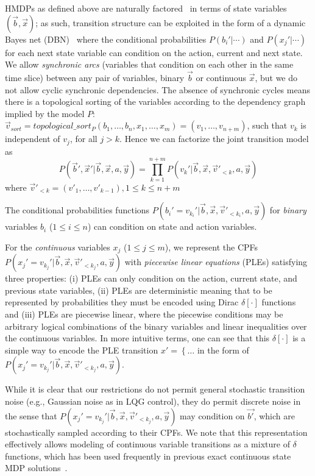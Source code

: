 HMDPs as defined above are naturally factored~\cite{boutilier99dt}
in terms of state variables $(\vec{b},\vec{x})$; as such,
transition structure can be exploited in the form of a dynamic Bayes
net (DBN)~\cite{dbn} where the conditional probabilities
$P(b_i'|\cdots)$ and $P(x_j'|\cdots)$ for each next state variable can
condition on the action, current and next state.  We allow  
\emph{synchronic arcs} (variables that condition on each
other in the same time slice) between any pair of variables, binary $\vec{b}$ or
continuous $\vec{x}$, but we do not allow cyclic synchronic dependencies. 
The absence of synchronic cycles means there is a topological sorting of the variables according to the dependency graph implied by the model $P$: $\vec{v}_{sort}=topological\_sort_{P}( b_1,\ldots,b_n,x_{1},\ldots,x_m ) =  ( v_1,\ldots, v_{n+m})$, such that $v_k$ is independent of $v_j$, for all $j >k$. Hence we can factorize the joint transition model as
{\footnotesize
\begin{equation}
P(\vec{b}',\vec{x}'|\vec{b},\vec{x},a,\vec{y}) = 
\prod_{k=1}^{n+m} P(v_k'| \vec{b},\vec{x}, \vec{v}'_{<k}, a,\vec{y}) \nonumber %
\end{equation}}
where $\vec{v}'_{<k} = ( v'_1,\ldots, v'_{k-1}), 1\leq k \leq n+m$

The conditional probabilities functions $P(b_i'=v_{k_i}'|\vec{b},\vec{x},\vec{v}'_{<{k_i}},a,\vec{y})$ for \emph{binary} variables $b_i$ ($1 \leq i \leq n$) can condition on state and action variables.  

For the \emph{continuous} variables $x_j$ ($1 \leq j \leq m$), we represent the CPFs $P(x_j'=v_{k_j}'|\vec{b},\vec{x},\vec{v}'_{<{k_j}},a,\vec{y})$ with \emph{piecewise
linear equations} (PLEs) satisfying three properties: (i) PLEs 
can only condition on the action, current state, and previous state variables, (ii) PLEs are
deterministic meaning that to be represented by probabilities they
must be encoded using Dirac $\delta[\cdot]$ functions and (iii) PLEs are piecewise linear, where the piecewise conditions may be arbitrary logical combinations of the binary variables
and linear inequalities over the continuous variables. In more intuitive
terms, one can see that this $\delta[\cdot]$ is a simple way to encode
the PLE transition $x' = \left\{ \ldots \right.$ in the form of 
$P(x_j'=v_{k_j}'|\vec{b},\vec{x},\vec{v}'_{<{k_j}},a,\vec{y})$.

While it is clear that our restrictions do not permit general stochastic transition
noise (e.g., Gaussian noise as in LQG control), they do permit
discrete noise in the sense that $P(x_j'=v_{k_j}'|\vec{b},\vec{x},\vec{v}'_{<{k_j}},a,\vec{y})$ may condition on $\vec{b'}$, which are stochastically sampled according to their CPFs.
We note that this representation effectively allows modeling of
continuous variable transitions as a mixture of $\delta$ functions,
which has been used frequently in previous exact continuous state MDP
solutions~\cite{feng04,hao09}.

